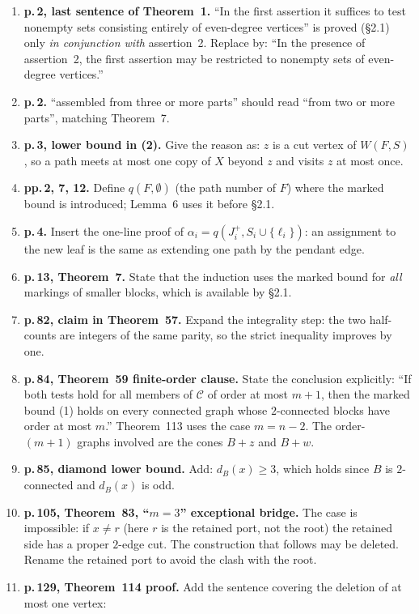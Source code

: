 \documentclass[11pt]{amsart}
\begin{document}
\begin{enumerate}
\item \textbf{p.\,2, last sentence of Theorem~1.} ``In the first assertion it suffices to test nonempty
sets consisting entirely of even-degree vertices'' is proved (\S2.1) only \emph{in conjunction with}
assertion~2. Replace by: ``In the presence of assertion~2, the first assertion may be restricted to
nonempty sets of even-degree vertices.''
\item \textbf{p.\,2.} ``assembled from three or more parts'' should read ``from two or more parts'',
matching Theorem~7.
\item \textbf{p.\,3, lower bound in (2).} Give the reason as: $z$ is a cut vertex of $W(F,S)$, so a
path meets at most one copy of $X$ beyond $z$ and visits $z$ at most once.
\item \textbf{pp.\,2, 7, 12.} Define $q(F,\emptyset)$ (the path number of $F$) where the marked bound is
introduced; Lemma~6 uses it before \S2.1.
\item \textbf{p.\,4.} Insert the one-line proof of $\alpha_i=q(J_i^+,S_i\cup\{\ell_i\})$: an assignment
to the new leaf is the same as extending one path by the pendant edge.
\item \textbf{p.\,13, Theorem~7.} State that the induction uses the marked bound for \emph{all}
markings of smaller blocks, which is available by \S2.1.
\item \textbf{p.\,82, claim in Theorem~57.} Expand the integrality step: the two half-counts are
integers of the same parity, so the strict inequality improves by one.
\item \textbf{p.\,84, Theorem~59 finite-order clause.} State the conclusion explicitly: ``If both tests
hold for all members of $\mathcal C$ of order at most $m+1$, then the marked bound (1) holds on every
connected graph whose $2$-connected blocks have order at most $m$.'' Theorem~113 uses the case
$m=n-2$. The order-$(m+1)$ graphs involved are the cones $B+z$ and $B+w$.
\item \textbf{p.\,85, diamond lower bound.} Add: $d_B(x)\ge3$, which holds since $B$ is $2$-connected and
$d_B(x)$ is odd.
\item \textbf{p.\,105, Theorem~83, ``$m=3$'' exceptional bridge.} The case is impossible: if $x\neq r$
(here $r$ is the retained port, not the root) the retained side has a proper $2$-edge cut. The
construction that follows may be deleted. Rename the retained port to avoid the clash with the root.
\item \textbf{p.\,129, Theorem~114 proof.} Add the sentence covering the deletion of at most one vertex:

\end{enumerate}
\end{document}

